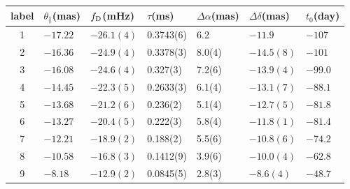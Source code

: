 \documentclass[useAMS,usenatbib]{mn2e}
\begin{document}
\begin{table}
\centering
\begin{tabular}{c|llllll}
\hline
label & $\theta_{\parallel}$(mas) & $f_{\rm D}$(mHz) & $\tau$(ms)  & $\Delta\alpha$(mas) & $\Delta\delta$(mas) & $t_0$(day)\\
\hline
1& $-17.22$   & $-26.1(4)$    & 0.3743(6)         & 6.2    & $-11.9$      & $-107$                               \\
2& $-16.36$  & $-24.9(4)$      & 0.3378(3)         & 8.0(4)  & $-14.5(8)$      &$-101$                                \\
3& $-16.08$   & $-24.6(4)$       & 0.327(3)   & 7.2(6)  & $-13.9(4)$       & $-99.0$                                \\
4& $-14.45$   & $-22.3(5)$      & 0.2633(3)    & 6.1(4)  & $-13.1(7)$     & $-88.1$                                \\
5& $-13.68$ & $-21.2(6)$        & 0.236(2)    & 5.1(4)  & $-12.7(5)$      & $-81.8$                                \\
6& $-13.27$ & $-20.4(5)$      & 0.222(3)     & 5.8(4)  & $-11.8(1)$    & $-81.4$                                \\
7& $-12.21$   & $-18.9(2)$      & 0.188(2)   & 5.5(6) & $-10.8(6)$      & $-74.2$                        \\
8& $-10.58$   & $-16.8(3)$      & 0.1412(9)  & 3.9(6) & $-10.0(4)$      & $-62.8$                                \\
9& $-8.18$   & $-12.9(2)$      & 0.0845(5) & 2.8(3)  & $-8.6(4)$      & $-48.7$                                
\\ \hline


\end{tabular}
\end{table}
\end{document}
